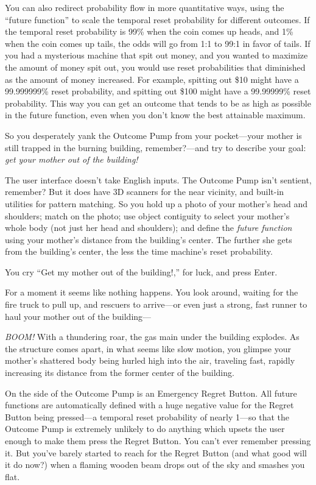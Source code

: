 {
 You can also redirect probability flow in more quantitative ways,
using the ``future function'' to
scale the temporal reset probability for different outcomes. If the
temporal reset probability is 99\% when the coin comes up heads, and
1\% when the coin comes up tails, the odds will go from 1:1 to 99:1 in
favor of tails. If you had a mysterious machine that spit out money,
and you wanted to maximize the amount of money spit out, you would use
reset probabilities that diminished as the amount of money increased.
For example, spitting out \$10 might have a 99.999999\% reset
probability, and spitting out \$100 might have a 99.99999\% reset
probability. This way you can get an outcome that tends to be as high
as possible in the future function, even when you don't
know the best attainable maximum.}

{
 So you desperately yank the Outcome Pump from your pocket---your
mother is still trapped in the burning building, remember?---and try to
describe your goal: \textit{get your mother out of the building!}}

{
 The user interface doesn't take English inputs.
The Outcome Pump isn't sentient, remember? But it does
have 3D scanners for the near vicinity, and built-in utilities for
pattern matching. So you hold up a photo of your
mother's head and shoulders; match on the photo; use
object contiguity to select your mother's whole body
(not just her head and shoulders); and define the \textit{future
function} using your mother's distance from the
building's center. The further she gets from the
building's center, the less the time
machine's reset probability.}

{
 You cry ``Get my mother out of the
building!,'' for luck, and press Enter.}

{
 For a moment it seems like nothing happens. You look around,
waiting for the fire truck to pull up, and rescuers to arrive---or even
just a strong, fast runner to haul your mother out of the building---}

{
 \textit{BOOM!} With a thundering roar, the gas main under the
building explodes. As the structure comes apart, in what seems like
slow motion, you glimpse your mother's shattered body
being hurled high into the air, traveling fast, rapidly increasing its
distance from the former center of the building.}

{
 On the side of the Outcome Pump is an Emergency Regret Button. All
future functions are automatically defined with a huge negative value
for the Regret Button being pressed---a temporal reset probability of
nearly 1---so that the Outcome Pump is extremely unlikely to do
anything which upsets the user enough to make them press the Regret
Button. You can't ever remember pressing it. But
you've barely started to reach for the Regret Button
(and what good will it do now?) when a flaming wooden beam drops out of
the sky and smashes you flat.}


